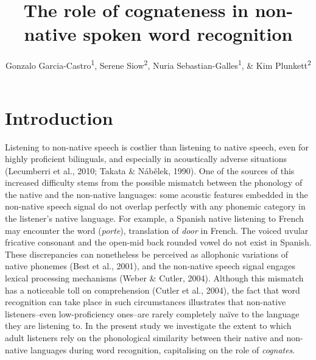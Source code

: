 \documentclass[
  english,
  man,floatsintext]{apa7}
\title{The role of cognateness in non-native spoken word recognition}
\author{Gonzalo Garcia-Castro\textsuperscript{1}, Serene Siow\textsuperscript{2}, Nuria Sebastian-Galles\textsuperscript{1}, \& Kim Plunkett\textsuperscript{2}}
\date{}
\affiliation{\vspace{0.5cm}\textsuperscript{1} Center for Brain and Cognition, Universitat Pompeu Fabra\\\textsuperscript{2} Department of Experimental Psychology, University of Oxford}
\begin{document}
\maketitle

\hypertarget{introduction}{%
\section{Introduction}\label{introduction}}

Listening to non-native speech is costlier than listening to native speech, even for highly proficient bilinguals, and especially in acoustically adverse situations (Lecumberri et al., 2010; Takata \& Nábělek, 1990). One of the sources of this increased difficulty stems from the possible mismatch between the phonology of the native and the non-native languages: some acoustic features embedded in the non-native speech signal do not overlap perfectly with any phonemic category in the listener's native language. For example, a Spanish native listening to French may encounter the word  (\emph{porte}), translation of \emph{door} in French. The voiced uvular fricative consonant  and the open-mid back rounded vowel  do not exist in Spanish. These discrepancies can nonetheless be perceived as allophonic variations of native phonemes (Best et al., 2001), and the non-native speech signal engages lexical processing mechanisms (Weber \& Cutler, 2004). Although this mismatch has a noticeable toll on comprehension (Cutler et al., 2004), the fact that word recognition can take place in such circumstances illustrates that non-native listeners--even low-proficiency ones--are rarely completely naïve to the language they are listening to. In the present study we investigate the extent to which adult listeners rely on the phonological similarity between their native and non-native languages during word recognition, capitalising on the role of \emph{cognates}.
\end{document}

